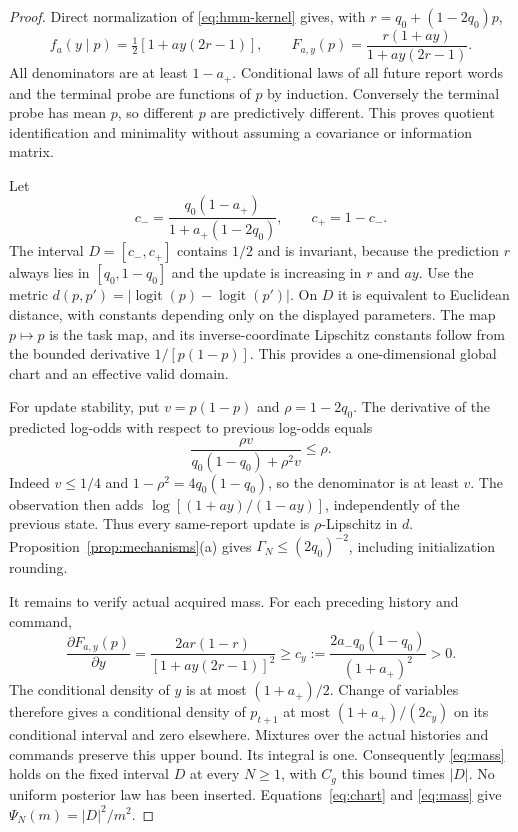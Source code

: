 \begin{proof}
Direct normalization of \eqref{eq:hmm-kernel} gives, with $r=q_0+(1-2q_0)p$,
\begin{equation}\label{eq:hmm-update}
 f_a(y\mid p)=\tfrac12[1+ay(2r-1)],\qquad
 F_{a,y}(p)=\frac{r(1+ay)}{1+ay(2r-1)}.
\end{equation}
All denominators are at least $1-a_+$. Conditional laws of all future report words and the terminal probe are functions of $p$ by induction. Conversely the terminal probe has mean $p$, so different $p$ are predictively different. This proves quotient identification and minimality without assuming a covariance or information matrix.

Let
\[
 c_- =\frac{q_0(1-a_+)}{1+a_+(1-2q_0)},\qquad c_+=1-c_-.
\]
The interval $D=[c_-,c_+]$ contains $1/2$ and is invariant, because the prediction $r$ always lies in $[q_0,1-q_0]$ and the update is increasing in $r$ and $ay$. Use the metric
$d(p,p')=|\operatorname{logit}(p)-\operatorname{logit}(p')|$.
On $D$ it is equivalent to Euclidean distance, with constants depending only on the displayed parameters. The map $p\mapsto p$ is the task map, and its inverse-coordinate Lipschitz constants follow from the bounded derivative $1/[p(1-p)]$. This provides a one-dimensional global chart and an effective valid domain.

For update stability, put $v=p(1-p)$ and $\rho=1-2q_0$. The derivative of the predicted log-odds with respect to previous log-odds equals
\[
 \frac{\rho v}{q_0(1-q_0)+\rho^2 v}\le\rho.
\]
Indeed $v\le1/4$ and $1-\rho^2=4q_0(1-q_0)$, so the denominator is at least $v$. The observation then adds $\log[(1+ay)/(1-ay)]$, independently of the previous state. Thus every same-report update is $\rho$-Lipschitz in $d$. Proposition~\ref{prop:mechanisms}(a) gives $\Gamma_N\le(2q_0)^{-2}$, including initialization rounding.

It remains to verify actual acquired mass. For each preceding history and command,
\begin{equation}\label{eq:hmm-jacobian}
 \frac{\partial F_{a,y}(p)}{\partial y}
 =\frac{2ar(1-r)}{[1+ay(2r-1)]^2}
 \ge c_y:=\frac{2a_-q_0(1-q_0)}{(1+a_+)^2}>0.
\end{equation}
The conditional density of $y$ is at most $(1+a_+)/2$. Change of variables therefore gives a conditional density of $p_{t+1}$ at most $(1+a_+)/(2c_y)$ on its conditional interval and zero elsewhere. Mixtures over the actual histories and commands preserve this upper bound. Its integral is one. Consequently \eqref{eq:mass} holds on the fixed interval $D$ at every $N\ge1$, with $C_g$ this bound times $|D|$. No uniform posterior law has been inserted. Equations~\eqref{eq:chart} and \eqref{eq:mass} give $\Psi_N(m)=|D|^2/m^2$.


\end{proof}
